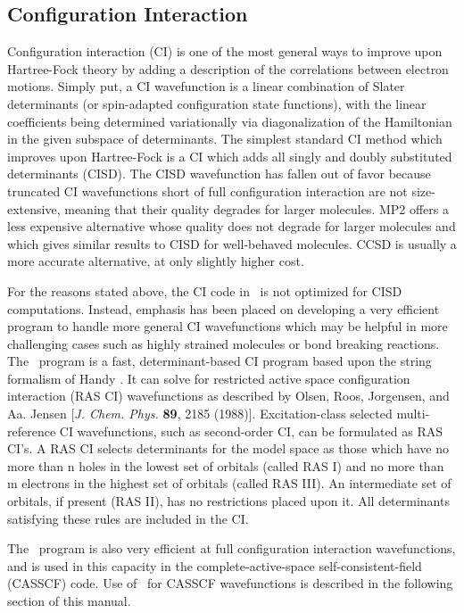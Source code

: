 \subsection{Configuration Interaction} \label{detci}
                                                                                
Configuration interaction (CI) is one of the most general ways to improve
upon Hartree-Fock theory by adding a description of the correlations
between electron motions.  Simply put, a CI wavefunction is a linear
combination of Slater determinants (or spin-adapted configuration
state functions), with the linear coefficients being determined 
variationally via diagonalization of the Hamiltonian in the given
subspace of determinants.  The simplest standard CI method which improves
upon Hartree-Fock is a CI which adds all singly and doubly substituted
determinants (CISD).  The CISD wavefunction
has fallen out of favor because truncated CI wavefunctions
short of full configuration interaction
are not size-extensive, meaning that their
quality degrades for larger molecules.  MP2 offers a less expensive
alternative whose quality does not degrade for larger molecules and which 
gives similar results to CISD for well-behaved molecules.  CCSD is 
usually a more accurate alternative, at only slightly higher
cost.

For the reasons stated above, the CI code in \PSIthree\ is not optimized
for CISD computations.  Instead, emphasis has been placed on developing
a very efficient program to handle more general CI wavefunctions
which may be helpful in more challenging cases such as highly strained
molecules or bond breaking reactions.  The \PSIdetci\ program is a fast,
determinant-based CI program based upon the string formalism of Handy
\cite{Handy:1980}.  It can solve for
restricted active space configuration interaction (RAS CI) wavefunctions
as described by Olsen, Roos, Jorgensen, and Aa. Jensen [{\em J. Chem.
Phys.} {\bf 89}, 2185 (1988)].  Excitation-class selected multi-reference
CI wavefunctions, such as second-order CI, can be formulated as RAS CI's.
A RAS CI selects determinants for the model space as those which have no
more than n holes in the lowest set of orbitals (called RAS I) and no
more than m electrons in the highest set of orbitals (called RAS III).
An intermediate set of orbitals, if present (RAS II), has no restrictions
placed upon it.  All determinants satisfying these rules are included
in the CI.  


The \PSIdetci\ program is also very efficient
at full configuration interaction wavefunctions, and is used in this
capacity in the complete-active-space self-consistent-field (CASSCF)
code.  Use of \PSIdetci\ for CASSCF wavefunctions is described
in the following section of this manual.

